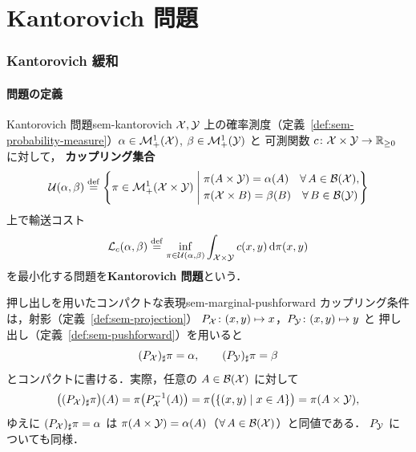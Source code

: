 \chapter{Kantorovich 問題}
\label{ch:sem-kantorovich-chapter}

\subsection{Kantorovich 緩和}
\label{sec:sem-kantorovich}

\subsubsection{問題の定義}

\begin{definition}{Kantorovich 問題}{sem-kantorovich}
  $\mathcal{X}, \mathcal{Y}$ 上の確率測度（定義~\ref{def:sem-probability-measure}）$\alpha \in \mathcal{M}_+^1(\mathcal{X})$, $\beta \in \mathcal{M}_+^1(\mathcal{Y})$ と
  可測関数 $c \colon \mathcal{X} \times \mathcal{Y} \to \mathbb{R}_{\geq 0}$ に対して，
  \textbf{カップリング集合}
  \[
    \mathcal{U}(\alpha, \beta) \overset{\mathrm{def}}{=}
    \left\{ \pi \in \mathcal{M}_+^1(\mathcal{X} \times \mathcal{Y}) \;\middle|\;
      \begin{aligned}
        &\pi(A \times \mathcal{Y}) = \alpha(A) \quad \forall\, A \in \mathcal{B}(\mathcal{X}), \\
        &\pi(\mathcal{X} \times B) = \beta(B)  \quad \forall\, B \in \mathcal{B}(\mathcal{Y})
      \end{aligned}
    \right\}
  \]
  上で輸送コスト
  \[
    \mathcal{L}_c(\alpha, \beta) \overset{\mathrm{def}}{=}
    \inf_{\pi \in \mathcal{U}(\alpha, \beta)}
    \int_{\mathcal{X} \times \mathcal{Y}} c(x, y) \, \mathrm{d}\pi(x, y)
  \]
  を最小化する問題を\textbf{Kantorovich 問題}という．
\end{definition}

\begin{remark}{押し出しを用いたコンパクトな表現}{sem-marginal-pushforward}
  カップリング条件は，射影（定義~\ref{def:sem-projection}）
  $P_{\mathcal{X}} \colon (x,y) \mapsto x$，$P_{\mathcal{Y}} \colon (x,y) \mapsto y$ と
  押し出し（定義~\ref{def:sem-pushforward}）を用いると
  \[
    (P_{\mathcal{X}})_\sharp \pi = \alpha, \qquad (P_{\mathcal{Y}})_\sharp \pi = \beta
  \]
  とコンパクトに書ける．実際，任意の $A \in \mathcal{B}(\mathcal{X})$ に対して
  \[
    \bigl((P_{\mathcal{X}})_\sharp \pi\bigr)(A)
    = \pi\bigl(P_{\mathcal{X}}^{-1}(A)\bigr)
    = \pi\bigl(\{(x,y) \mid x \in A\}\bigr)
    = \pi(A \times \mathcal{Y}),
  \]
  ゆえに $(P_{\mathcal{X}})_\sharp \pi = \alpha$ は
  $\pi(A \times \mathcal{Y}) = \alpha(A)$（$\forall\, A \in \mathcal{B}(\mathcal{X})$）と同値である．
  $P_{\mathcal{Y}}$ についても同様．
\end{remark}

